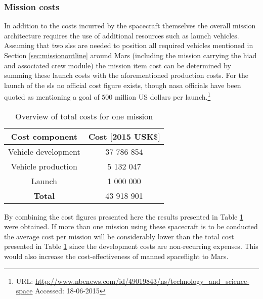 \subsubsection{Mission costs}
In addition to the costs incurred by the spacecraft themselves the overall mission architecture requires the use of additional resources such as launch vehicles. Assuming that two \glspl{sls} are needed to position all required vehicles mentioned in Section \ref{sec:missionoutline} around Mars (including the mission carrying the \gls{hiad} and associated crew module) the mission item cost can be determined by summing these launch costs with the aforementioned production costs. For the launch of the \gls{sls} no official cost figure exists, though \gls{nasa} officials have been quoted as mentioning a goal of $500$ million US dollars per launch.\footnote{URL: \url{http://www.nbcnews.com/id/49019843/ns/technology_and_science-space} Accessed: 18-06-2015}\\
\begin{table}
	\centering
	\caption{Overview of total costs for one mission}
	\begin{tabular}{|c|c|}
		\hline
		\textbf{Cost component} & \textbf{Cost $\mathbf{[2015}$ $\mathbf{US K\$]}$} \\ \hline 
		\hline
		Vehicle development & 37 786 854 \\
		Vehicle production & 5 132 047\\
		Launch & 1 000 000\\ \hline
		\textbf{Total} & 43 918 901\\ \hline
	\end{tabular}
	\label{tab:missioncosts}
\end{table}
By combining the cost figures presented here the results presented in Table \ref{tab:missioncosts} were obtained. If more than one mission using these spacecraft is to be conducted the average cost per mission will be considerably lower than the total cost presented in Table \ref{tab:missioncosts} since the development costs are non-recurring expenses. This would also increase the cost-effectiveness of manned spaceflight to Mars.
